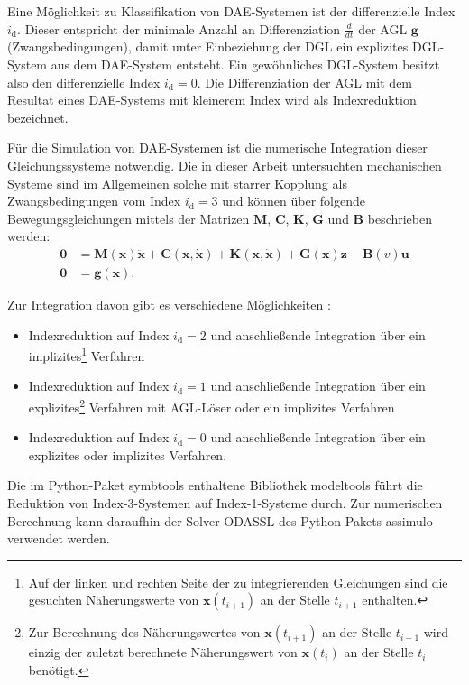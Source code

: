 Eine Möglichkeit zu Klassifikation von DAE-Systemen ist der differenzielle Index $i_\mathrm{d}$. Dieser entspricht der minimale Anzahl an Differenziation $\frac{d}{dt}$ der AGL $\mathbf{g}$ (Zwangsbedingungen), damit unter Einbeziehung der DGL ein explizites DGL-System aus dem DAE-System entsteht. Ein gewöhnliches DGL-System besitzt also den differenzielle Index $i_\mathrm{d} = 0$. Die Differenziation der AGL mit dem Resultat eines DAE-Systems mit kleinerem Index wird als Indexreduktion bezeichnet. \cite[S.139]{JanschekSystementwurf}

Für die Simulation von DAE-Systemen ist die numerische Integration dieser Gleichungssysteme notwendig. Die in dieser Arbeit untersuchten mechanischen Systeme sind im Allgemeinen solche mit starrer Kopplung als Zwangsbedingungen vom Index $i_\mathrm{d} = 3$ und können über folgende Bewegungsgleichungen mittels der Matrizen $\mathbf{M}$, $\mathbf{C}$, $\mathbf{K}$, $\mathbf{G}$ und $\mathbf{B}$ beschrieben werden:
\begin{align}
\mathbf{0} &= \mathbf{M}(\mathbf{x}) \ddot{\mathbf{x}} + \mathbf{C}(\mathbf{x}, \dot{\mathbf{x}}) + \mathbf{K}(\mathbf{x}, \dot{\mathbf{x}}) + \mathbf{G}(\mathbf{x}) \mathbf{z} - \mathbf{B}(v) \mathbf{u} \label{eq:implicit_mechanical_system}\\
\mathbf{0} &= \mathbf{g}(\mathbf{x}).
\end{align}
\cite[S.240]{JanschekSystementwurf}

Zur Integration davon gibt es verschiedene Möglichkeiten \cite[Kap. 8]{ModSimSkript}: 
\begin{itemize}
\item  Indexreduktion auf Index $i_\mathrm{d} = 2$ und anschließende Integration über ein implizites\footnote{Auf der linken und rechten Seite der zu integrierenden Gleichungen sind die gesuchten Näherungswerte von $\mathbf{x}(t_{i+1})$ an der Stelle $t_{i+1}$ enthalten.} Verfahren
\item Indexreduktion auf Index $i_\mathrm{d} = 1$ und anschließende Integration über ein explizites\footnote{Zur Berechnung des Näherungswertes von $\mathbf{x}(t_{i+1})$ an der Stelle $t_{i+1}$ wird einzig der zuletzt berechnete Näherungswert von $\mathbf{x}(t_{i})$ an der Stelle $t_{i}$ benötigt.} Verfahren mit AGL-Löser oder ein implizites Verfahren
\item Indexreduktion auf Index  $i_\mathrm{d} = 0$ und anschließende Integration über ein explizites oder implizites Verfahren.
\end{itemize}
Die im Python-Paket symbtools \cite{symbtools} enthaltene Bibliothek modeltools führt die Reduktion von Index-3-Systemen auf Index-1-Systeme durch. Zur numerischen Berechnung kann daraufhin der Solver ODASSL des Python-Pakets assimulo \cite{assimulo} verwendet werden.

